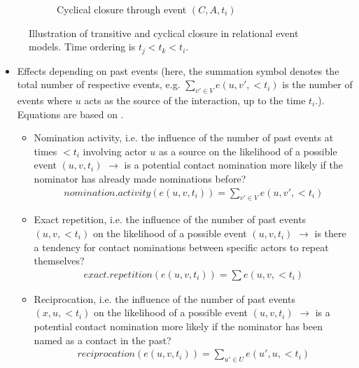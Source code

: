 \begin{figure}
\begin{mdframed}
\begin{subfigure}[t]{0.2\linewidth}
		\caption{Cyclical closure through event $(C,A,t_i)$}
	\end{subfigure}
	\caption{Illustration of transitive and cyclical closure in relational event models. Time ordering is $t_j < t_k < t_i$.}
	\label{fig:rem_closure}
	\end{mdframed}
\end{figure}

\begin{itemize}
	\item Effects depending on past events (here, the summation symbol denotes the total number of respective events, e.g. $\sum_{v' \in V} e(u,v',<t_i)$ is the number of events where $u$ acts as the source of the interaction, up to the time $t_i$.). Equations are based on \cite{butts20084,pilny_rem,brandes2009networks,perry2013point}.
	\begin{itemize}
		\item Nomination activity, i.e. the influence of the number of past events at times $<t_i$ involving actor $u$ as a source on the likelihood of a possible event $(u,v,t_i)$ $\rightarrow$ is a potential contact nomination more likely if the nominator has already made nominations before?
		\begin{align*}
			nomination.activity(e(u,v,t_i)) = \sum_{v' \in V} e(u,v',<t_i)
		\end{align*}
		\item Exact repetition, i.e. the influence of the number of past events $(u,v,<t_i)$ on the likelihood of a possible event $(u,v,t_i)$ $\rightarrow$ is there a tendency for contact nominations between specific actors to repeat themselves?
		\begin{align*}
			exact.repetition(e(u,v,t_i)) = \sum e(u,v,<t_i)
		\end{align*}
		\item Reciprocation, i.e. the influence of the number of past events $(x,u,<t_i)$ on the likelihood of a possible event $(u,v,t_i)$ $\rightarrow$ is a potential contact nomination more likely if the nominator has been named as a contact in the past?
		\begin{align*}
			reciprocation(e(u,v,t_i)) = \sum_{u' \in U} e(u',u,<t_i)

\end{align*}
\end{itemize}
\end{itemize}
